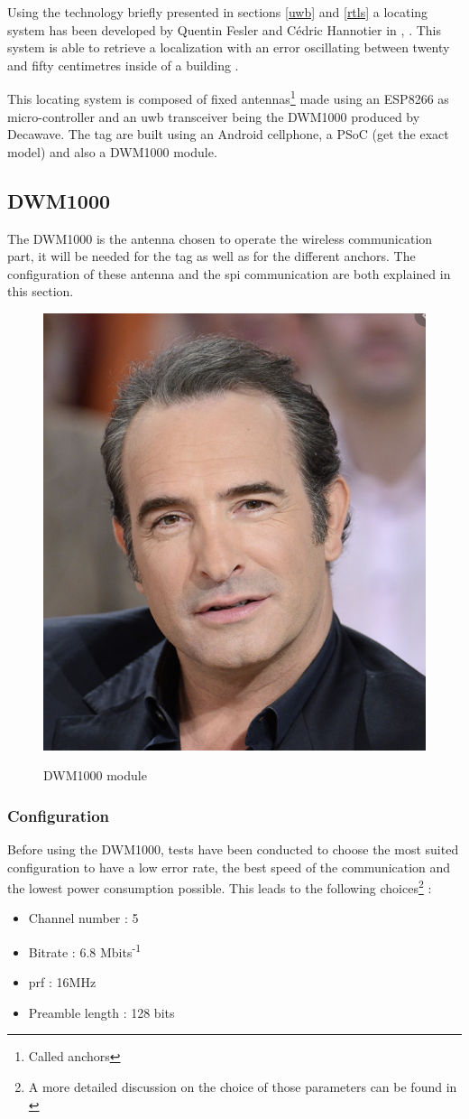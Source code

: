 Using the technology briefly presented in sections \ref{uwb} and \ref{rtls} a locating system has been developed by Quentin Fesler and Cédric Hannotier in  \cite{fesler2018high}, \cite{hannotier2019indoor}. This system is able to retrieve a localization with an error oscillating between twenty and fifty centimetres inside of a building \cite{guyard2019navigation}.
\vspace{2mm}

This locating system is composed of fixed antennas\footnote{Called anchors} made using an ESP8266 as micro-controller and an \gls{uwb} transceiver being the DWM1000 produced by Decawave\cite{decawave}. The tag are built using an Android cellphone, a PSoC \color{red} (get the exact model) \color{black} and also a DWM1000 module.

\subsection{DWM1000}

The DWM1000 is the antenna chosen to operate the wireless communication part, it will be needed for the tag as well as for the different anchors. The configuration of these antenna and the \gls{spi} communication are both explained in this section.

\begin{figure}[H]
	\centering
	\includegraphics[width=.2\linewidth]{Images/Temporary_pic.png}
	\label{fig:dwm1000}
	\caption{DWM1000 module}
\end{figure}

\subsubsection{Configuration}

Before using the DWM1000, tests have been conducted to choose the most suited configuration to have a low error rate, the  best speed of the communication and the lowest power consumption possible. This leads to the following choices\footnote{A more detailed discussion on the choice of those parameters can be found in \cite{hannotier2019indoor}} :

\begin{itemize}
\item Channel number : 5
\item Bitrate : 6.8 Mbits\textsuperscript{-1}
\item \gls{prf} : 16MHz
\item Preamble length : 128 bits
\end{itemize}


